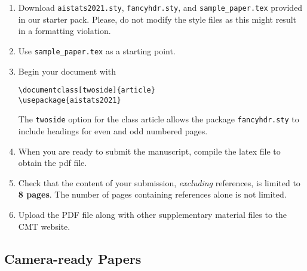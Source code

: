 \documentclass[twoside]{article}
\begin{document}
\begin{enumerate}
    \item Download \texttt{aistats2021.sty}, \texttt{fancyhdr.sty}, and \texttt{sample\_paper.tex} provided in our starter pack. 
    Please, do not modify the style files as this might result in a formatting violation.
    
    \item Use \texttt{sample\_paper.tex} as a starting point.
    \item Begin your document with
    \begin{flushleft}
    \texttt{\textbackslash documentclass[twoside]\{article\}}\\
    \texttt{\textbackslash usepackage\{aistats2021\}}
    \end{flushleft}
    The \texttt{twoside} option for the class article allows the
    package \texttt{fancyhdr.sty} to include headings for even and odd
    numbered pages.
    \item When you are ready to submit the manuscript, compile the latex file to obtain the pdf file.
    \item Check that the content of your submission, \emph{excluding} references, is limited to \textbf{8 pages}. The number of pages containing references alone is not limited.
    \item Upload the PDF file along with other supplementary material files to the CMT website.
\end{enumerate}

\subsection{Camera-ready Papers}

\end{document}
